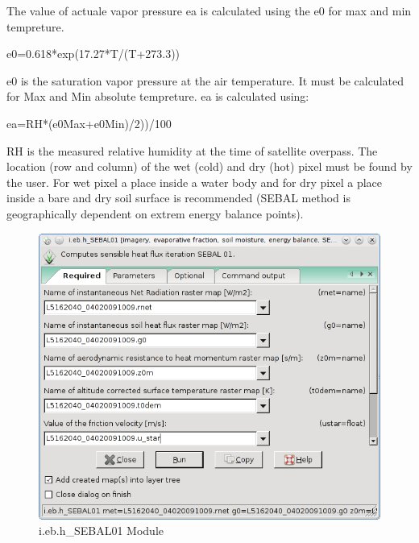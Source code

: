 The value of actuale vapor pressure ea is calculated using the e0 for max and min tempreture.\newline
\begin{smallverbatim}
    e0=0.618*exp(17.27*T/(T+273.3))  
\end{smallverbatim}
e0 is the saturation vapor pressure at the air temperature. It must be calculated for Max and Min absolute tempreture.\newline
ea is calculated using:\newline
\begin{smallverbatim}
    ea=RH*(e0Max+e0Min)/2))/100  
\end{smallverbatim}
RH is the measured relative humidity at the time of satellite overpass.\newline
The location (row and column) of the wet (cold) and dry (hot) pixel must be found by the user. For wet pixel a place inside a water body and for dry pixel a place inside a bare and dry soil surface is recommended (SEBAL method is geographically dependent on extrem energy balance points).\newline

\begin{figure}[htbp]
   \centering
   \includegraphics[scale=0.4]{gipe027.png}
   \caption{i.eb.h\_SEBAL01 Module}
   \label{fig:gipe027}
\end{figure}

